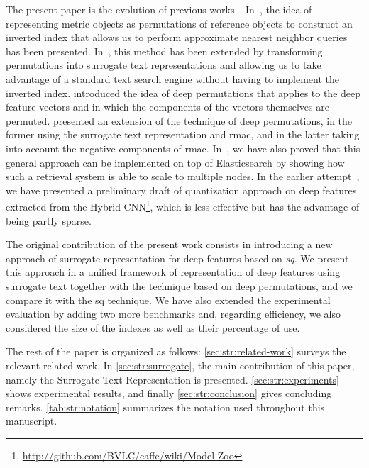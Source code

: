 The present paper is the evolution of previous works~\cite{amato2014mi,gennaro2010approach,amato2016deep,amato2017efficient,amato2018large}.
In~\cite{amato2014mi}, the idea of representing metric objects as permutations of reference objects to construct an inverted index that allows us to perform approximate nearest neighbor queries has been presented.
In~\cite{gennaro2010approach}, this method has been extended by transforming permutations into surrogate text representations and allowing us to take advantage of a standard text search engine without having to implement the inverted index.
\citet{amato2016deep} introduced the idea of deep permutations that applies to the deep feature vectors and in which the components of the vectors themselves are permuted.
\citet{amato2017efficient,amato2018large} presented an extension of the technique of deep permutations, in the former using the surrogate text representation and \gls{rmac}, and in the latter taking into account the negative components of \gls{rmac}.
In~\cite{amato2018large}, we have also proved that this general approach can be implemented on top of Elasticsearch by showing how such a retrieval system is able to scale to multiple nodes.
In the earlier attempt~\cite{amato2016large}, we have presented a preliminary draft of quantization approach on deep features extracted from the Hybrid CNN\footnote{\url{http://github.com/BVLC/caffe/wiki/Model-Zoo}}, which is less effective but has the advantage of being partly sparse.

The original contribution of the present work consists in introducing a new approach of surrogate representation for deep features based on \emph{\gls{sq}}.
We present this approach in a unified framework of representation of deep features using surrogate text together with the technique based on deep permutations, and we compare it with the \gls{sq} technique.
We have also extended the experimental evaluation by adding two more benchmarks and, regarding efficiency, we also considered the size of the indexes as well as their percentage of use.

The rest of the paper is organized as follows: \ref{sec:str:related-work} surveys the relevant related work.
In \ref{sec:str:surrogate}, the main contribution of this paper, namely the Surrogate Text Representation is presented.
\ref{sec:str:experiments} shows experimental results, and finally \ref{sec:str:conclusion} gives concluding remarks.
\ref{tab:str:notation} summarizes the  notation used throughout this manuscript.


